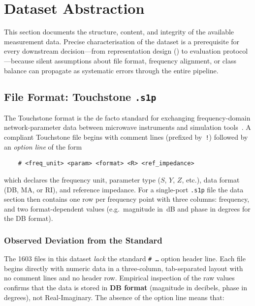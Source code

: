 
\section{Dataset Abstraction}
\label{sec:dataset}

This section documents the structure, content, and integrity of the
available measurement data.  Precise characterisation of the dataset is a
prerequisite for every downstream decision—from representation design
() to evaluation protocol—because silent assumptions
about file format, frequency alignment, or class balance can propagate as
systematic errors through the entire pipeline.

\subsection{File Format: Touchstone \texttt{.s1p}}
\label{sec:dataset:format}

The Touchstone format is the de facto standard for exchanging
frequency-domain network-parameter data between microwave instruments and
simulation tools~\cite{touchstone_spec, keysight_s2p_format}.  A
compliant Touchstone file begins with comment lines (prefixed by~\texttt{!})
followed by an \emph{option line} of the form

\begin{verbatim}
    # <freq_unit> <param> <format> <R> <ref_impedance>
\end{verbatim}

\noindent
which declares the frequency unit, parameter type ($S$, $Y$, $Z$, etc.),
data format (DB, MA, or RI), and reference impedance.  For a single-port
\texttt{.s1p} file the data section then contains one row per frequency
point with three columns: frequency, and two format-dependent values
(e.g.\ magnitude in~dB and phase in degrees for the DB format).

\subsubsection{Observed Deviation from the Standard}
\label{sec:dataset:format:deviation}

The \num{1603} files in this dataset \emph{lack} the standard
\texttt{\#\,\ldots} option header line.  Each file begins directly with
numeric data in a three-column, tab-separated layout with no comment
lines and no header row.  Empirical inspection of the raw values
confirms that the data is stored in \textbf{DB format}
(magnitude in decibels, phase in degrees), not Real-Imaginary.
The absence of the option line means that:

